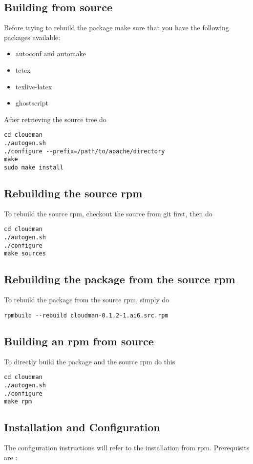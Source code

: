 \documentclass[12pt]{article}
\begin{document}
\subsection{Building from source}
Before trying to rebuild the package make sure that you have the following packages available:
\begin{itemize}
\item autoconf and automake
\item tetex
\item texlive-latex
\item ghostscript
\end{itemize}

After retrieving the source tree do 
\begin{verbatim}
cd cloudman
./autogen.sh
./configure --prefix=/path/to/apache/directory 
make 
sudo make install
\end{verbatim}

\subsection{Rebuilding the source rpm}
To rebuild the source rpm, checkout the source from git first, then do
\begin{verbatim}
cd cloudman
./autogen.sh
./configure
make sources
\end{verbatim}

\subsection{Rebuilding the package from the source rpm}
To rebuild the package from the source rpm, simply do 
\begin{verbatim}
rpmbuild --rebuild cloudman-0.1.2-1.ai6.src.rpm
\end{verbatim}

\subsection{Building an rpm from source}
To directly build the package and the source rpm do this
\begin{verbatim}
cd cloudman
./autogen.sh
./configure
make rpm
\end{verbatim}

\subsection{Installation and Configuration}
The configuration instructions will refer to the installation from rpm.
Prerequisits are : 
\end{document}
